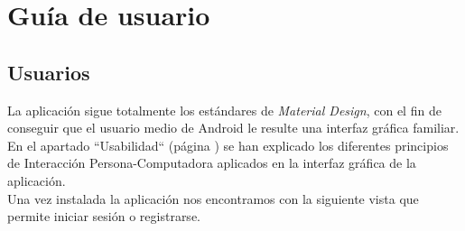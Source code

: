 \documentclass[twoside]{report}
\begin{document}
\section{Guía de usuario}

\subsection{Usuarios}
La aplicación sigue totalmente los estándares de \textit{Material Design}, con el fin de conseguir que el usuario medio de Android le resulte una interfaz gráfica familiar. En el apartado “Usabilidad“ (página \pageref{usabilitymatters}) se han explicado los diferentes principios de Interacción Persona-Computadora aplicados en la interfaz gráfica de la aplicación.\\

Una vez instalada la aplicación nos encontramos con la siguiente vista que permite iniciar sesión o registrarse.
\end{document}
